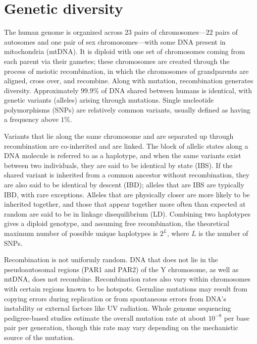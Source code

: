 \section{Genetic diversity}

The human genome is organized across $23$ pairs of chromosomes---$22$ pairs of autosomes and one pair of sex chromosomes---with some DNA present in mitochondria (mtDNA). It is diploid with one set of chromosomes coming from each parent via their gametes; these chromosomes are created through the process of meiotic recombination, in which the chromosomes of grandparents are aligned, cross over, and recombine. Along with mutation, recombination generates diversity. Approximately $99.9\%$ of DNA shared between humans is identical, with genetic variants (alleles) arising through mutations. Single nucleotide polymorphisms (SNPs) are relatively common variants, usually defined as having a frequency above $1\%$.

Variants that lie along the same chromosome and are separated up through recombination are co-inherited and are linked. The block of allelic states along a DNA molecule is referred to as a haplotype, and when the same variants exist between two individuals, they are said to be identical by state (IBS). If the shared variant is inherited from a common ancestor without recombination, they are also said to be identical by descent (IBD); alleles that are IBS are typically IBD, with rare exceptions. Alleles that are physically closer are more likely to be inherited together, and those that appear together more often than expected at random are said to be in linkage disequilibrium (LD). Combining two haplotypes gives a diploid genotype, and assuming free recombination, the theoretical maximum number of possible unique haplotypes is $2^L$, where $L$ is the number of SNPs.

Recombination is not uniformly random. DNA that does not lie in the pseudoautosomal regions (PAR1 and PAR2) of the Y chromosome, as well as mtDNA, does not recombine\citep{jobling_human_2013}. Recombination rates also vary within chromosomes with certain regions known to be hotspots\citep{altemose_map_2017}. Germline mutations may result from copying errors during replication or from spontaneous errors from DNA’s instability or external factors like UV radiation. Whole genome sequencing pedigree-based studies estimate the overall mutation rate at about $10^{-8}$ per base pair per generation, though this rate may vary depending on the mechanistic source of the mutation\citep{segurel_determinants_2014}.

